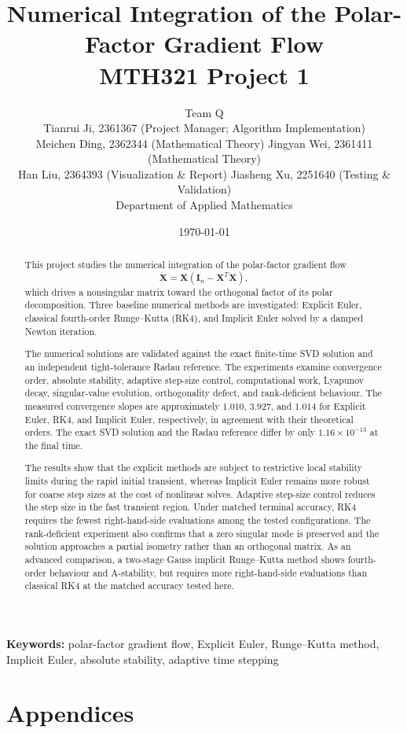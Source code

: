 \documentclass[11pt,a4paper]{article}
\title{
\textbf{Numerical Integration of the Polar-Factor Gradient Flow}\\[2mm]
\large MTH321 Project 1
}
\author{
    Team Q \\
    \small Tianrui Ji, 2361367 (Project Manager; Algorithm Implementation) \\
    \small Meichen Ding, 2362344 (Mathematical Theory) \quad
    Jingyan Wei, 2361411 (Mathematical Theory) \\
    \small Han Liu, 2364393 (Visualization \& Report) \quad
    Jiasheng Xu, 2251640 (Testing \& Validation) \\
    \small Department of Applied Mathematics
}
\date{\today}
\theoremstyle{definition}
\theoremstyle{remark}
\begin{document}
\maketitle
\begin{abstract}

This project studies the numerical integration of the polar-factor
gradient flow
\[
\dot{\mathbf{X}}
=
\mathbf{X}
\left(
\mathbf{I}_n-\mathbf{X}^{T}\mathbf{X}
\right),
\]
which drives a nonsingular matrix toward the orthogonal factor of its
polar decomposition. Three baseline numerical methods are investigated:
Explicit Euler, classical fourth-order Runge--Kutta (RK4), and Implicit
Euler solved by a damped Newton iteration.

The numerical solutions are validated against the exact finite-time SVD
solution and an independent tight-tolerance Radau reference. The
experiments examine convergence order, absolute stability, adaptive
step-size control, computational work, Lyapunov decay, singular-value
evolution, orthogonality defect, and rank-deficient behaviour. The
measured convergence slopes are approximately $1.010$, $3.927$, and
$1.014$ for Explicit Euler, RK4, and Implicit Euler, respectively, in
agreement with their theoretical orders. The exact SVD solution and the
Radau reference differ by only $1.16\times10^{-13}$ at the final time.

The results show that the explicit methods are subject to restrictive
local stability limits during the rapid initial transient, whereas
Implicit Euler remains more robust for coarse step sizes at the cost of
nonlinear solves. Adaptive step-size control reduces the step size in
the fast transient region. Under matched terminal accuracy, RK4 requires
the fewest right-hand-side evaluations among the tested configurations.
The rank-deficient experiment also confirms that a zero singular mode is
preserved and the solution approaches a partial isometry rather than an
orthogonal matrix.
As an advanced comparison, a two-stage Gauss implicit Runge--Kutta
method shows fourth-order behaviour and A-stability, but requires more
right-hand-side evaluations than classical RK4 at the matched accuracy
tested here.

\end{abstract}
\noindent\textbf{Keywords:}
polar-factor gradient flow, Explicit Euler, Runge--Kutta method,
Implicit Euler, absolute stability, adaptive time stepping

\vspace{1em}
\begingroup\small
\tableofcontents
\endgroup
\newpage







\bigskip
{}

\clearpage
\section*{Appendices}
\appendix



\end{document}

